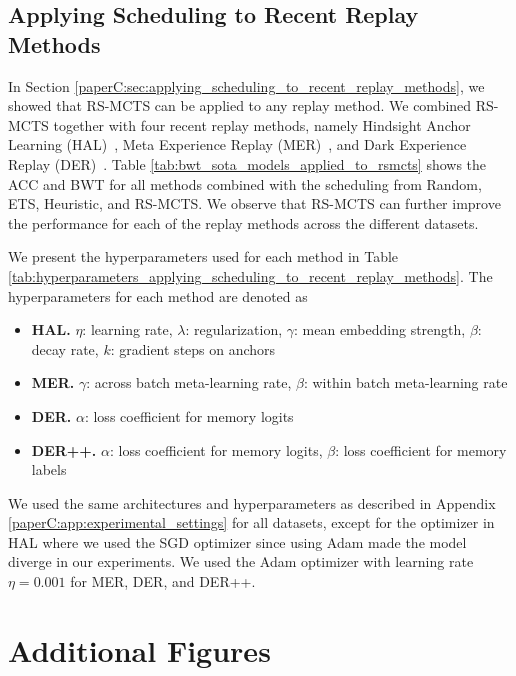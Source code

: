 \subsection{Applying Scheduling to Recent Replay Methods}
\label{paperC:app:apply_scheduling_to_recent_replay_methods}

In Section \ref{paperC:sec:applying_scheduling_to_recent_replay_methods}, we showed that RS-MCTS can be applied to any replay method. We combined RS-MCTS together with four recent replay methods, namely Hindsight Anchor Learning (HAL)~, Meta Experience Replay (MER)~, and Dark Experience Replay (DER)~. Table \ref{tab:bwt_sota_models_applied_to_rsmcts} shows the ACC and BWT for all methods combined with the scheduling from Random, ETS, Heuristic, and RS-MCTS. We observe that RS-MCTS can further improve the performance for each of the replay methods across the different datasets.  

We present the hyperparameters used for each method in Table \ref{tab:hyperparameters_applying_scheduling_to_recent_replay_methods}. The hyperparameters for each method are denoted as
\begin{itemize}[topsep=0pt, leftmargin=*, noitemsep]
	\item {\bf HAL.} $\eta$: learning rate, $\lambda$: regularization, $\gamma$: mean embedding strength, $\beta$: decay rate, $k$: gradient steps on anchors   
	\item {\bf MER.} $\gamma$: across batch meta-learning rate, $\beta$: within batch meta-learning rate 
	\item {\bf DER.} $\alpha$: loss coefficient for memory logits 
	\item {\bf DER++.} $\alpha$: loss coefficient for memory logits, $\beta$: loss coefficient for memory labels
\end{itemize}
We %
used the same architectures and hyperparameters as described in Appendix \ref{paperC:app:experimental_settings} for all datasets, except for the optimizer in HAL where we used the SGD optimizer since using Adam made the model diverge in our experiments. %
We used the Adam optimizer with learning rate $\eta=0.001$ for MER, DER, and DER++. 



\section{Additional Figures}\label{paperC:app:additional_figures}

